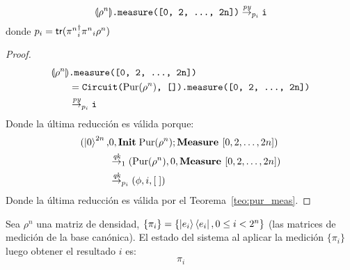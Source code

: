 \begin{lema}\label{lem:measpy}
    \[\llparenthesis \rho^n \rrparenthesis\texttt{.measure([0, 2, \dots, 2n])} \overset{\textit{py}}{\rightarrow}_{p_i} \texttt{i}\]
    donde $p_i= \mathsf{tr}({\pi^n}_i^\dagger{\pi^n}_i\rho^n)$
\end{lema}
\begin{proof}
\begin{align*}
    \llparenthesis \rho^n \rrparenthesis&\texttt{.measure([0, 2, \dots, 2n])} \\
    &= \texttt{Circuit(}\text{Pur}(
    \rho^n)\texttt{, []).measure([0, 2, \dots, 2n])}\\
    &\overset{\textit{py}}{\rightarrow}_{p_i} \texttt{i}
\end{align*}
Donde la última reducción es válida porque:
\begin{align*}
(\ket{0}^{2n}, &0, \textbf{Init}\;\text{Pur}(\rho^n); \textbf{Measure } [0, 2, \dots, 2n]) \\
&\overset{\textit{qk}}{\rightarrow}_1 (\text{Pur}(\rho^n), 0, \textbf{Measure } [0, 2, \dots, 2n])\\
&\overset{\textit{qk}}{\rightarrow}_{p_i} (\phi, i, [\;])
\end{align*}
Donde la última reducción es válida por el Teorema~\ref{teo:pur_meas}.
\end{proof}
\begin{lema}\label{lem:measall}
Sea $\rho^n$ una matriz de densidad, $\{ \pi_i \} = \{\ket{e_i}\bra{e_i}, 0\leq i < 2^n\}$ (las matrices de medición de la base canónica). El estado del sistema al aplicar la medición $\{\pi_i \}$ luego obtener el resultado $i$ es: 
\[\pi_i\]
\end{lema}
